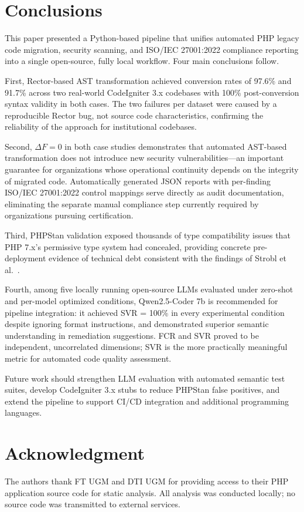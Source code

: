 \documentclass[conference]{IEEEtran}
\begin{document}
\section{Conclusions}

This paper presented a Python-based pipeline that unifies
automated PHP legacy code migration, security scanning, and
ISO/IEC 27001:2022 compliance reporting into a single
open-source, fully local workflow. Four main conclusions follow.

First, Rector-based AST transformation achieved conversion rates
of 97.6\% and 91.7\% across two real-world CodeIgniter 3.x
codebases with 100\% post-conversion syntax validity in both
cases. The two failures per dataset were caused by a
reproducible Rector bug, not source code characteristics,
confirming the reliability of the approach for institutional
codebases.

Second, $\Delta F = 0$ in both case studies demonstrates that
automated AST-based transformation does not introduce new
security vulnerabilities---an important guarantee for
organizations whose operational continuity depends on the
integrity of migrated code. Automatically generated JSON
reports with per-finding ISO/IEC 27001:2022 control mappings
serve directly as audit documentation, eliminating the separate
manual compliance step currently required by organizations
pursuing certification.

Third, PHPStan validation exposed thousands of type
compatibility issues that PHP 7.x's permissive type system
had concealed, providing concrete pre-deployment evidence of
technical debt consistent with the findings of Strobl et al.\
\cite{strobl2020automated}.

Fourth, among five locally running open-source LLMs evaluated
under zero-shot and per-model optimized conditions, Qwen2.5-Coder
7b is recommended for pipeline integration: it achieved SVR =
100\% in every experimental condition despite ignoring format
instructions, and demonstrated superior semantic understanding
in remediation suggestions. FCR and SVR proved to be
independent, uncorrelated dimensions; SVR is the more
practically meaningful metric for automated code quality
assessment.

Future work should strengthen LLM evaluation with automated
semantic test suites, develop CodeIgniter 3.x stubs to reduce
PHPStan false positives, and extend the pipeline to support
CI/CD integration and additional programming languages.

\section*{Acknowledgment}

The authors thank FT UGM and DTI UGM for providing access to
their PHP application source code for static analysis. All
analysis was conducted locally; no source code was transmitted
to external services.

{}

\end{document}
